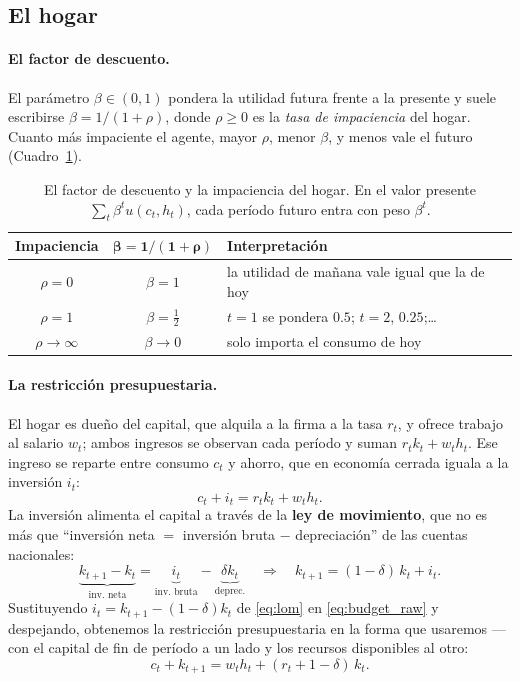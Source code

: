 \documentclass[11pt,a4paper]{report}
\begin{document}
\subsection{El hogar}
\label{sec:hogar}

\paragraph{El factor de descuento.} El parámetro $\beta\in(0,1)$ pondera la utilidad
futura frente a la presente y suele escribirse $\beta=1/(1+\rho)$, donde $\rho\ge 0$
es la \emph{tasa de impaciencia} del hogar. Cuanto más impaciente el agente, mayor
$\rho$, menor $\beta$, y menos vale el futuro (Cuadro~\ref{tab:impaciencia}).

\begin{table}[H]
\centering\small
\begin{tabular}{ccl}
\toprule
\textbf{Impaciencia} & $\boldsymbol{\beta=1/(1+\rho)}$ & \textbf{Interpretación}\\
\midrule
$\rho=0$ & $\beta=1$ & la utilidad de mañana vale igual que la de hoy\\
$\rho=1$ & $\beta=\tfrac12$ & $t{=}1$ se pondera $0.5$; $t{=}2$, $0.25$;\ldots\\
$\rho\to\infty$ & $\beta\to 0$ & solo importa el consumo de hoy\\
\bottomrule
\end{tabular}
\caption{El factor de descuento y la impaciencia del hogar. En el valor presente
$\sum_t\beta^t u(c_t,h_t)$, cada período futuro entra con peso $\beta^t$.}
\label{tab:impaciencia}
\end{table}

\paragraph{La restricción presupuestaria.} El hogar es dueño del capital, que alquila
a la firma a la tasa $r_t$, y ofrece trabajo al salario $w_t$; ambos ingresos se
observan cada período y suman $r_t k_t + w_t h_t$. Ese ingreso se reparte entre
consumo $c_t$ y ahorro, que en economía cerrada iguala a la inversión $i_t$:
\begin{equation}
c_t + i_t = r_t k_t + w_t h_t.
\label{eq:budget_raw}
\end{equation}
La inversión alimenta el capital a través de la \textbf{ley de movimiento}, que no es
más que ``inversión neta $=$ inversión bruta $-$ depreciación'' de las cuentas
nacionales:
\begin{equation}
\underbrace{k_{t+1}-k_t}_{\text{inv.\ neta}}=\underbrace{i_t}_{\text{inv.\ bruta}}
-\underbrace{\delta k_t}_{\text{deprec.}}
\quad\Longrightarrow\quad
k_{t+1} = (1-\delta)\,k_t + i_t.
\label{eq:lom}
\end{equation}
Sustituyendo $i_t=k_{t+1}-(1-\delta)k_t$ de \eqref{eq:lom} en \eqref{eq:budget_raw} y
despejando, obtenemos la restricción presupuestaria en la forma que usaremos ---con el
capital de fin de período a un lado y los recursos disponibles al otro:
\begin{equation}
c_t + k_{t+1} = w_t h_t + (r_t + 1 - \delta)\,k_t.
\label{eq:budget}
\end{equation}
\end{document}
